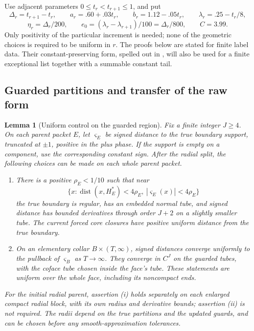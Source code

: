 \documentclass[11pt]{article}
\numberwithin{equation}{section}
\newtheorem{lemma}[theorem]{Lemma}
\theoremstyle{definition}
\theoremstyle{remark}
\begin{document}
Use adjacent parameters $0\le t_r<t_{r+1}\le1$, and put
\[
 \Delta_r=t_{r+1}-t_r,\qquad
 a_r=.60+.03t_r,\qquad b_r=1.12-.05t_r,\qquad
 \lambda_r=.25-t_r/8,
\]
\[
 \eta_r=\Delta_r/200,\qquad
 e_0=(\lambda_r-\lambda_{r+1})/100=\Delta_r/800,
 \qquad C=3.99.
\]
Only positivity of the particular increment is needed; none of the
geometric choices is required to be uniform in $r$.  The proofs below
are stated for finite label data.  Their constant-preserving form,
spelled out in , will also be used
for a finite exceptional list together with a summable constant tail.

\subsection{Guarded partitions and transfer of the raw form}

\begin{lemma}[Uniform control on the guarded region]\label{regular:guards}
Fix a finite integer $J\ge4$.  On each parent packet $E$, let
$\varsigma_E$ be signed distance to the true boundary support, truncated
at $\pm1$, positive in the plus phase.  If the support is empty on a
component, use the corresponding constant sign.  After the radial split,
the following choices can be made on each whole parent packet.
\begin{enumerate}[label=(\roman*)]
\item There is a positive $\rho_E<1/10$ such that near
\[
 \{x:\operatorname{dist}(x,H_E^*)<4\rho_E,\ |\varsigma_E(x)|<4\rho_E\}
\]
the true boundary is regular, has an embedded normal tube, and signed
distance has bounded derivatives through order $J+2$ on a slightly
smaller tube.  The current forced core closures have positive uniform
distance from the true boundary.
\item On an elementary collar $B\times(T,\infty)$, signed distances
converge uniformly to the pullback of $\varsigma_B$ as $T\to\infty$.
They converge in $C^J$ on the guarded tubes, with the coface tube chosen
inside the face's tube.  These statements are uniform over the whole
face, including its noncompact ends.
\end{enumerate}
For the initial radial parent, assertion \textup{(i)} holds separately
on each enlarged compact radial block, with its own radius and derivative
bounds; assertion \textup{(ii)} is not required.
The radii depend on the true partitions and the updated guards, and can
be chosen before any smooth-approximation tolerances.
\end{lemma}
\end{document}
